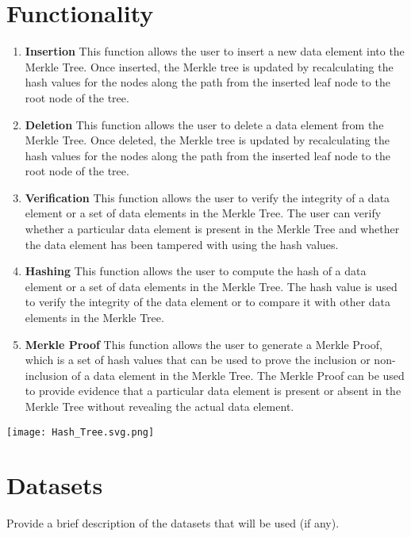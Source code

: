 \documentclass{article}
\begin{document}
\section{Functionality}
\begin{enumerate}
    \item \textbf{Insertion} This function allows the user to insert a new data element into the Merkle Tree. Once inserted, the Merkle tree is updated by recalculating the hash values for the nodes along the path from the inserted leaf node to the root node of the tree.
    \item \textbf{Deletion} This function allows the user to delete a data element from the Merkle Tree. Once deleted, the Merkle tree is updated by recalculating the hash values for the nodes along the path from the inserted leaf node to the root node of the tree.
    \item \textbf{Verification} This function allows the user to verify the integrity of a data element or a set of data elements in the Merkle Tree. The user can verify whether a particular data element is present in the Merkle Tree and whether the data element has been tampered with using the hash values.
    \item \textbf{Hashing} This function allows the user to compute the hash of a data element or a set of data elements in the Merkle Tree. The hash value is used to verify the integrity of the data element or to compare it with other data elements in the Merkle Tree.
    \item \textbf{Merkle Proof} This function allows the user to generate a Merkle Proof, which is a set of hash values that can be used to prove the inclusion or non-inclusion of a data element in the Merkle Tree. The Merkle Proof can be used to provide evidence that a particular data element is present or absent in the Merkle Tree without revealing the actual data element.
\end{enumerate}
\texttt{[image: Hash\_Tree.svg.png]}
\section{Datasets}
Provide a brief description of the datasets that will be used (if any).
\newpage
\end{document}
